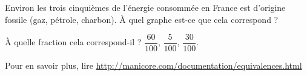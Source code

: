 
\begin{exercice}\label{exosmath-0818}

    Environ les trois cinquièmes de l'énergie consommée en France est d'origine fossile (gaz, pétrole, charbon). À quel graphe est-ce que cela correspond ?

\begin{center}
   
   
   
\end{center}

À quelle fraction cela correspond-il ? \( \dfrac{ 60 }{ 100 }\), \( \dfrac{ 5 }{ 100 }\), \( \dfrac{ 30 }{ 100 }\).

    Pour en savoir plus, lire \url{http://manicore.com/documentation/equivalences.html}

\end{exercice}

